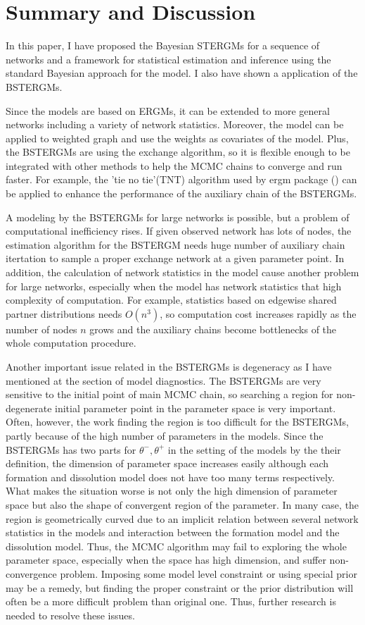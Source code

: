 \documentclass[aspectratio=169,ignorenonframetext,9pt]{beamer}
\theoremstyle{plain}
\theoremstyle{definition}
\begin{document}
\section{Summary and Discussion}
In this paper, I have proposed the Bayesian STERGMs for a sequence of networks
and a framework for statistical estimation and inference using the standard Bayesian approach for the model.
I also have shown a application of the BSTERGMs. %

Since the models are based on ERGMs, it can be extended to more general networks
including a variety of network statistics.
Moreover, the model can be applied to weighted graph and use the weights as covariates of the model.
Plus, the BSTERGMs are using the exchange algorithm, so it is flexible enough to be integrated
with other methods to help the MCMC chains to converge and run faster.
For example, the 'tie no tie'(TNT) algorithm used by ergm package (\cite{RN100}) can be applied to
enhance the performance of the auxiliary chain of the BSTERGMs.

A modeling by the BSTERGMs for large networks is possible,
but a problem of computational inefficiency rises.
If given observed network has lots of nodes, the estimation algorithm for the BSTERGM needs 
huge number of auxiliary chain itertation to sample a proper exchange network at a given parameter point.
In addition, the calculation of network statistics in the model cause another problem for large networks,
especially when the model has network statistics that high complexity of computation.
For example, statistics based on edgewise shared partner distributions needs $O(n^3)$,
so computation cost increases rapidly as the number of nodes $n$ grows and
the auxiliary chains become bottlenecks of the whole computation procedure.

Another important issue related in the BSTERGMs is degeneracy as I have mentioned at the section of model diagnostics.
The BSTERGMs are very sensitive to the initial point of main MCMC chain, so
searching a region for non-degenerate initial parameter point in the parameter space is very important.
Often, however, the work finding the region is too difficult for the BSTERGMs,
partly because of the high number of parameters in the models.
Since the BSTERGMs has two parts for $\theta^-, \theta^+$ in the setting of the models by the their definition,
the dimension of parameter space increases easily although each formation and dissolution model does not have
too many terms respectively.
What makes the situation worse is not only the high dimension of parameter space but also the shape of convergent region of the parameter.
In many case, the region is geometrically curved due to an implicit relation between several network statistics in the models
and interaction between the formation model and the dissolution model.
Thus, the MCMC algorithm may fail to exploring the whole parameter space, especially when the space has high dimension,
and suffer non-convergence problem.
Imposing some model level constraint or using special prior may be a remedy,
but finding the proper constraint or the prior distribution will often be a more difficult problem than original one.
Thus, further research is needed to resolve these issues.
\end{document}
